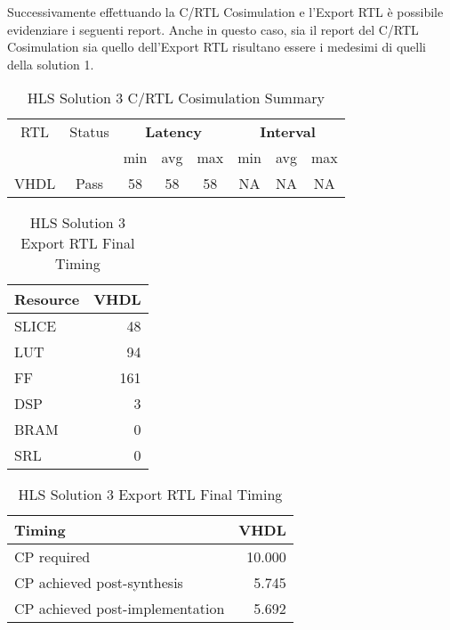 Successivamente effettuando la C/RTL Cosimulation e l'Export RTL è possibile evidenziare i seguenti report. Anche in questo caso, sia il report del C/RTL Cosimulation sia quello dell'Export RTL risultano essere i medesimi di quelli della solution 1.
\begin{table}[H]
	\centering
	\begin{tabular}{|c|c|c|c|c|c|c|c|}
		\hline
		\multicolumn{1}{|c|}{RTL} & \multicolumn{1}{|c|}{Status} & \multicolumn{3}{c|}{\textbf{Latency}} & \multicolumn{3}{c|}{\textbf{Interval}} \\
		&  & min & avg & max & min & avg & max \\
		\hline
		VHDL & Pass & 58 & 58 & 58 & NA & NA & NA \\
		\hline
	\end{tabular}
	\caption{HLS Solution 3 C/RTL Cosimulation Summary }
	\label{tab:hls-solution-3-cosimulation-summary}
\end{table}

\begin{table}[H]
	\centering
	\begin{minipage}[t]{0.45\linewidth}
		\centering
		\begin{tabular}{|l|r|}
			\hline
			\textbf{Resource} & \textbf{VHDL} \\
			\hline
			SLICE & 48 \\
			\hline
			LUT & 94 \\
			\hline
			FF & 161 \\
			\hline
			DSP & 3 \\
			\hline
			BRAM & 0 \\
			\hline
			SRL & 0 \\
			\hline
		\end{tabular}
		\caption{HLS Solution 3 Export RTL Resource Usage}
		\label{tab:hls-solution-3-export-rtl-resoruce-usage}
	\end{minipage}
	\hfill
	\begin{minipage}[t]{0.45\linewidth}
		\centering
		\begin{tabular}{|l|r|}
			\hline
			\textbf{Timing} & \textbf{VHDL} \\
			\hline
			CP required & 10.000 \\
			\hline
			CP achieved post-synthesis & 5.745 \\
			\hline
			CP achieved post-implementation & 5.692 \\
			\hline
		\end{tabular}
		\caption{HLS Solution 3 Export RTL Final Timing}
		\label{tab:hls-solution-3-export-rtl-final-timing}
	\end{minipage}
\end{table}
